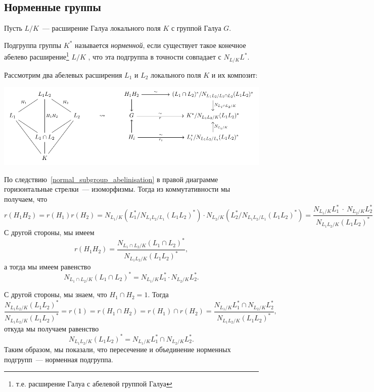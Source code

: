 
\subsection{Норменные группы}

		Пусть $L/K$~--- расширение Галуа локального поля $K$ с группой Галуа $G$. 

		\begin{definition} 
			Подгруппа группы $K^*$  называется \emph{норменной}, если существует такое конечное абелево расширение\footnote{т.е. расширение Галуа с абелевой группой Галуа} $L/K$ , что эта подгруппа в точности совпадает с $N_{L/K}L^*$.
		\end{definition}

	Рассмотрим  два абелевых расширения $L_1$ и $L_2$ локального поля $K$ и их композит: 

		\begin{center}
				\includegraphics{lectures/6/pictures/cd_40.pdf}
	\end{center}

	По следствию~\ref{normal_subgroup_abelinisation} в  правой диаграмме горизонтальные стрелки~--- изоморфизмы.  Тогда из коммутативности мы получаем, что 
	\[
		r(H_1 H_2) = r(H_1)r(H_2) = N_{L_1/K}(L_1^*/N_{L_1 L_2/L_1}(L_1 L_2)^*) \cdot N_{L_2/K}(L_2^*/N_{L_1 L_2/L_1}(L_1 L_2)^*) = \frac{N_{L_1/K} L_{1}^*  \ \cdot \ N_{L_2/K}L_{2}^*}{N_{L_1L_2/K}(L_1 L_2)^*}
	\]
	С другой стороны, мы имеем 
	\[
		r(H_1 H_2) = \frac{N_{L_1 \cap L_2/K} (L_1 \cap L_2)^*}{ N_{L_1 L_2/K}(L_1 L_2)^*},
	\]
	а тогда мы имеем равенство 
	\[
		N_{L_1 \cap L_2/K} (L_1 \cap L_2)^* = N_{L_1/K}L_1^* \cdot N_{L_2/K}L_2^*.
	\]

	С другой стороны, мы знаем, что $H_1 \cap H_2 = 1$. Тогда 
	\[
		\frac{N_{L_1 L_2/K}(L_1 L_2)^*}{N_{L_1 L_2/K}(L_1 L_2)^*} = r(1) = r(H_1 \cap H_2) = r(H_1) \cap r(H_2) = \frac{ N_{L_1/K} L_1^* \cap N_{L_2/K} L_2^*}{N_{L_1 L_2/K}(L_1 L_2)^*},
	\]
	откуда мы получаем равенство 
	\[
		N_{L_1 L_2/K}(L_1 L_2)^* = N_{L_1/K}L_1^* \cap N_{L_2/K} L_2^*.
	\]
	Таким образом, мы показали, что пересечение и объединение норменных подгрупп~--- норменная подгруппа. 

